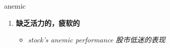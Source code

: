 
\begin{frame}
{\huge anemic}
\begin{center}
\begin{enumerate}\Large
  \item \textbf{缺乏活力的，疲软的}
  \begin{itemize}
    \item \em{\Large{stock's anemic performance 股市低迷的表现}}
  \end{itemize}
\end{enumerate}
\end{center}
\end{frame}
